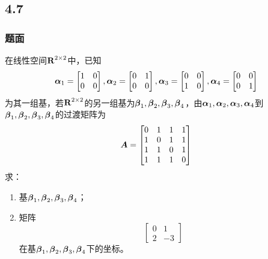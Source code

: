 \documentclass{beamer}
\begin{document}
\subsection*{4.7}
\begin{frame}[allowframebreaks]
    \frametitle{题面}

    在线性空间\(\boldsymbol{\mathrm{R}}^{2\times2}\)中，已知
    \begin{equation*}
        \boldsymbol{\alpha}_1=\begin{bmatrix}1&0\\0&0\end{bmatrix},
        \boldsymbol{\alpha}_2=\begin{bmatrix}0&1\\0&0\end{bmatrix},
        \boldsymbol{\alpha}_3=\begin{bmatrix}0&0\\1&0\end{bmatrix},
        \boldsymbol{\alpha}_4=\begin{bmatrix}0&0\\0&1\end{bmatrix}
    \end{equation*}
    为其一组基，若\(\boldsymbol{\mathrm{R}}^{2\times2}\)的另一组基为\(\boldsymbol{\beta}_1,\boldsymbol{\beta}_2,\boldsymbol{\beta}_3,\boldsymbol{\beta}_4\)，由\(\boldsymbol{\alpha}_1,\boldsymbol{\alpha}_2,\boldsymbol{\alpha}_3,\boldsymbol{\alpha}_4\)到\(\boldsymbol{\beta}_1,\boldsymbol{\beta}_2,\boldsymbol{\beta}_3,\boldsymbol{\beta}_4\)的过渡矩阵为
    \begin{equation*}
        \boldsymbol{A}=
        \begin{bmatrix}
            0 & 1 & 1 & 1 \\
            1 & 0 & 1 & 1 \\
            1 & 1 & 0 & 1 \\
            1 & 1 & 1 & 0
        \end{bmatrix}
    \end{equation*}
    求：
    \begin{enumerate}
        \item 基\(\boldsymbol{\beta}_1,\boldsymbol{\beta}_2,\boldsymbol{\beta}_3,\boldsymbol{\beta}_4\)；
        \item 矩阵\begin{equation*}\begin{bmatrix}0&1\\2&-3\end{bmatrix}\end{equation*}在基\(\boldsymbol{\beta}_1,\boldsymbol{\beta}_2,\boldsymbol{\beta}_3,\boldsymbol{\beta}_4\)下的坐标。
    \end{enumerate}

\end{frame}
\end{document}
